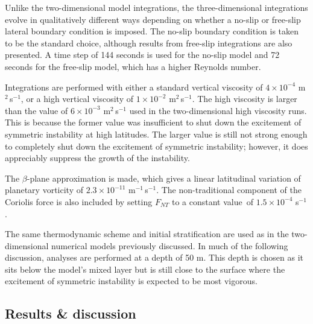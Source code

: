 Unlike the two-dimensional model integrations, the three-dimensional integrations evolve in qualitatively different ways depending on whether a no-slip or free-slip lateral boundary condition is imposed. The no-slip boundary condition is taken to be the standard choice, although results from free-slip integrations are also presented. A time step of 144 seconds is used for the no-slip model and 72 seconds for the free-slip model, which has a higher Reynolds number.

Integrations are performed with either a standard vertical viscosity of $4\times 10^{-4}$ m$^2$\,s$^{-1}$, or a high vertical viscosity of $1\times 10^{-2}$ m$^2$\,s$^{-1}$. The high viscosity is larger than the value of $6\times 10^{-3}$ m$^2$\,s$^{-1}$ used in the two-dimensional high viscosity runs. This is because the former value was insufficient to shut down the excitement of symmetric instability at high latitudes. The larger value is still not strong enough to completely shut down the excitement of symmetric instability; however, it does appreciably suppress the growth of the instability.

The $\beta$-plane approximation is made, which gives a linear latitudinal variation of planetary vorticity of $2.3\times 10^{-11}$ m$^{-1}$\,s$^{-1}$. The non-traditional component of the Coriolis force is also included by setting $F_{NT}$ to a constant value\footnotemark\ of $1.5\times 10^{-4}$ s$^{-1}$.

The same thermodynamic scheme and initial stratification are used as in the two-dimensional numerical models previously discussed. In much of the following discussion, analyses are performed at a depth of 50 m. This depth is chosen as it sits below the model's mixed layer but is still close to the surface where the excitement of symmetric instability is expected to be most vigorous.

\subsection{Results \& discussion}
\label{subsec:3DResults}
